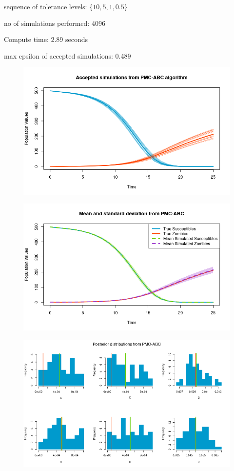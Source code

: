 \documentclass[]{article}
\begin{document}
sequence of tolerance levels: $\{ 10, 5, 1, 0.5\}$

no of simulations performed: 4096

Compute time: 2.89 seconds

max epsilon of accepted simulations: 0.489

\begin{figure}[H]
	\centering
	\includegraphics[width=0.8\linewidth]{../Figures/PMC-ABC_simulations}
\end{figure}

\begin{figure}[H]
	\centering
	\includegraphics[width=0.8\linewidth]{../Figures/PMC_ABC_sd_bands}
\end{figure}

\begin{figure}[H]
	\centering
	\includegraphics[width=1\linewidth]{../Figures/PMC_posteriors}
\end{figure}



\end{document}
